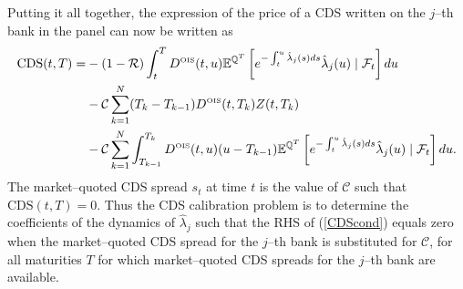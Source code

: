 \documentclass[12pt,a4paper]{article}
\theoremstyle{plain}
\numberwithin{equation}{section}
\begin{document}
Putting it all together, the expression of the price of a CDS written on the $j$--th bank in the panel can now be written as
\begin{align}
\mbox{CDS}(t,T)=&-(1-\mathcal{R})\int_{t}^{T} D^{\tiny \mbox{OIS}}(t,u)\mathbb{E}^{\mathbb{Q}^{T}}\left[e^{-\int_t^u \hat{\lambda}_j(s)ds}\hat{\lambda}_j(u)\mid \mathcal{F}_t\right]du\label{CDScond}\\ \nonumber
&-\mathcal{C}\sum_{k=1}^N  (T_k-T_{k-1})D^{\tiny \mbox{OIS}}(t,T_k)Z(t,T_k)\\
&-\mathcal{C}\sum_{k=1}^N\int_{T_{k-1}}^{T_k} D^{\tiny \mbox{OIS}}(t,u)(u-T_{k-1})\mathbb{E}^{\mathbb{Q}^{T}}\left[e^{-\int_t^u \hat{\lambda}_j(s)ds}\hat{\lambda}_j(u)\mid \mathcal{F}_t\right]du.\nonumber
\end{align}
The market--quoted CDS spread $s_t$ at time $t$  is the value of $\mathcal{C}$ such that $\mbox{CDS}(t,T)=0$. Thus the CDS calibration problem is to determine the coefficients of the dynamics of $\hat\lambda_j$ such that the RHS of (\ref{CDScond}) equals zero when the market--quoted CDS spread for the $j$--th bank is substituted for $\mathcal{C}$, for all maturities $T$ for which market--quoted CDS spreads for the $j$--th bank are available.
\end{document}
